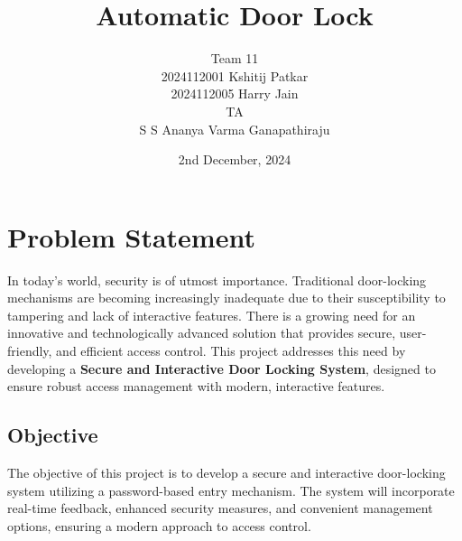 \documentclass[a4paper, 12pt]{article}
\title{\textbf{Automatic Door Lock}}
\author{Team 11 \\ 2024112001 Kshitij Patkar \\ 2024112005 Harry Jain \\ TA \\ S S Ananya Varma Ganapathiraju}
\date{2nd December, 2024}
\begin{document}
\maketitle
\tableofcontents
\newpage

\section{Problem Statement}
In today's world, security is of utmost importance. Traditional door-locking mechanisms are becoming increasingly inadequate due to their susceptibility to tampering and lack of interactive features. There is a growing need for an innovative and technologically advanced solution that provides secure, user-friendly, and efficient access control. This project addresses this need by developing a \textbf{Secure and Interactive Door Locking System}, designed to ensure robust access management with modern, interactive features.

\subsection*{Objective}
The objective of this project is to develop a secure and interactive door-locking system utilizing a password-based entry mechanism. The system will incorporate real-time feedback, enhanced security measures, and convenient management options, ensuring a modern approach to access control.
\end{document}
